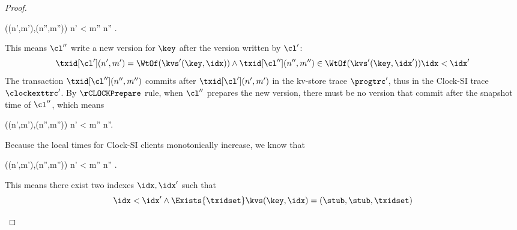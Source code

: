 \begin{proof}
\begin{enumerate}
\begin{enumerate}
\begin{enumerate}
            \begin{Formulae}
            \begin{Formula}
                (\txid[\cl'](n',m'),\txid[\cl''](n'',m'')) \in \WR[\kvs'] \implies n' < m'' \leq n'' .
                \label{equ:clock-wr-commit-time}
            \end{Formula}
            \end{Formulae}
            This means \( \cl'' \) write a new version for \( \key \) after the version written by \( \cl' \):
            \[
                \txid[\cl'](n',m')  = \WtOf(\kvs'(\key,\idx))
                \land \txid[\cl''](n'',m'')  \in \WtOf(\kvs'(\key,\idx')) 
                \idx < \idx'
            \]
            The transaction \( \txid[\cl''](n'',m'') \) commits after  \( \txid[\cl'](n',m') \) 
            in the kv-store trace \( \progtrc' \),
            thus in the Clock-SI trace \( \clockexttrc' \).
            By \( \rCLOCKPrepare \) rule, when \( \cl'' \) prepares the new version, 
            there must be no version that commit after the snapshot time of \( \cl'' \),
            which means
            \begin{Formulae}
            \begin{Formula}
                (\txid[\cl'](n',m'),\txid[\cl''](n'',m'')) \in \WW[\kvs] \implies n' < m'' \leq n''.
                \label{equ:clock-ww-commit-time}
            \end{Formula}
            \end{Formulae}
            Because the local times for Clock-SI clients monotonically increase,
            we know that
            \begin{Formulae}
            \begin{Formula}
                (\txid[\cl'](n',m'),\txid[\cl'](n'',m'')) \in \SO \implies n' < m'' \leq n'' .
                \label{equ:clock-so-commit-time}
            \end{Formula}
            \end{Formulae}
            This means there exist two indexes \( \idx, \idx' \) such that
            \[
                \idx < \idx'
                \land \Exists{\txidset}
                \kvs(\key,\idx) = (\stub, \stub, \txidset)
\]
\end{enumerate}
\end{enumerate}
\end{enumerate}
\end{proof}

